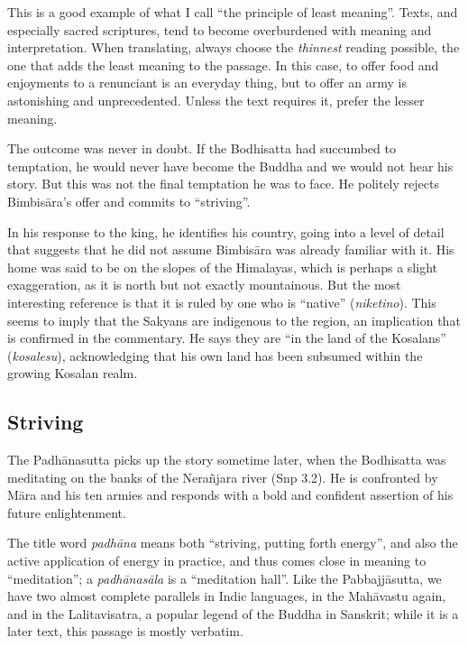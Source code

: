 \documentclass[12pt,openany]{book}%
\begin{document}
This is a good example of what I call “the principle of least meaning”. Texts, and especially sacred scriptures, tend to become overburdened with meaning and interpretation. When translating, always choose the \emph{thinnest} reading possible, the one that adds the least meaning to the passage. In this case, to offer food and enjoyments to a renunciant is an everyday thing, but to offer an army is astonishing and unprecedented. Unless the text requires it, prefer the lesser meaning.

The outcome was never in doubt. If the Bodhisatta had succumbed to temptation, he would never have become the Buddha and we would not hear his story. But this was not the final temptation he was to face. He politely rejects \textsanskrit{Bimbisāra}’s offer and commits to “striving”.

In his response to the king, he identifies his country, going into a level of detail that suggests that he did not assume \textsanskrit{Bimbisāra} was already familiar with it. His home was said to be on the slopes of the Himalayas, which is perhaps a slight exaggeration, as it is north but not exactly mountainous. But the most interesting reference is that it is ruled by one who is “native” (\textit{niketino}). This seems to imply that the Sakyans are indigenous to the region, an implication that is confirmed in the commentary. He says they are “in the land of the Kosalans” (\textit{kosalesu}), acknowledging that his own land has been subsumed within the growing Kosalan realm.

\subsection*{Striving}

The \textsanskrit{Padhānasutta} picks up the story sometime later, when the Bodhisatta was meditating on the banks of the \textsanskrit{Nerañjara} river (Snp 3.2). He is confronted by \textsanskrit{Māra} and his ten armies and responds with a bold and confident assertion of his future enlightenment.

The title word \textit{\textsanskrit{padhāna}} means both “striving, putting forth energy”, and also the active application of energy in practice, and thus comes close in meaning to “meditation”; a \textit{\textsanskrit{padhānasāla}} is a “meditation hall”. Like the \textsanskrit{Pabbajjāsutta}, we have two almost complete parallels in Indic languages, in the \textsanskrit{Mahāvastu} again, and in the Lalitavisatra, a popular legend of the Buddha in Sanskrit; while it is a later text, this passage is mostly verbatim.
\end{document}
